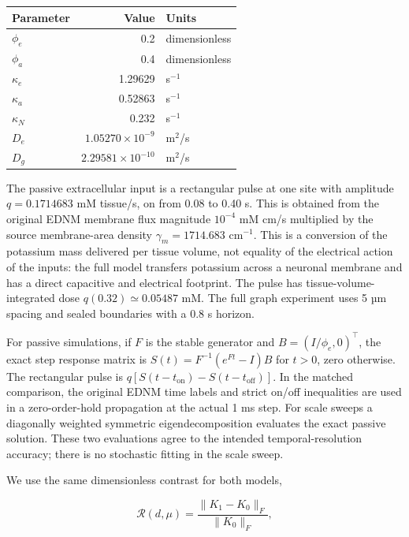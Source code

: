 \documentclass[
  11pt,
]{article}
\begin{document}
\begin{longtable}[]{@{}lrl@{}}
\toprule\noalign{}
Parameter & Value & Units \\
\midrule\noalign{}
\endhead
\bottomrule\noalign{}
\endlastfoot
\(\phi_e\) & 0.2 & dimensionless \\
\(\phi_a\) & 0.4 & dimensionless \\
\(\kappa_e\) & 1.29629 & s\(^{-1}\) \\
\(\kappa_a\) & 0.52863 & s\(^{-1}\) \\
\(\kappa_N\) & 0.232 & s\(^{-1}\) \\
\(D_e\) & \(1.05270\times10^{-9}\) & m\(^2\)/s \\
\(D_g\) & \(2.29581\times10^{-10}\) & m\(^2\)/s \\
\end{longtable}

The passive extracellular input is a rectangular pulse at one site with
amplitude \(q=0.1714683\) mM tissue/s, on from 0.08 to 0.40 s. This is
obtained from the original EDNM membrane flux magnitude \(10^{-4}\) mM
cm/s multiplied by the source membrane-area density
\(\gamma_m=1714.683\) cm\(^{-1}\). This is a conversion of the potassium
mass delivered per tissue volume, not equality of the electrical action
of the inputs: the full model transfers potassium across a neuronal
membrane and has a direct capacitive and electrical footprint. The pulse
has tissue-volume-integrated dose \(q(0.32)\simeq0.05487\) mM. The full
graph experiment uses 5 µm spacing and sealed boundaries with a 0.8 s
horizon.

For passive simulations, if \(F\) is the stable generator and
\(B=(I/\phi_e,0)^\top\), the exact step response matrix is
\(S(t)=F^{-1}(e^{Ft}-I)B\) for \(t>0\), zero otherwise. The rectangular
pulse is \(q[S(t-t_{\mathrm{on}})-S(t-t_{\mathrm{off}})]\). In the
matched comparison, the original EDNM time labels and strict on/off
inequalities are used in a zero-order-hold propagation at the actual 1
ms step. For scale sweeps a diagonally weighted symmetric
eigendecomposition evaluates the exact passive solution. These two
evaluations agree to the intended temporal-resolution accuracy; there is
no stochastic fitting in the scale sweep.

We use the same dimensionless contrast for both models,

\[\mathcal R(d,\mu)=\frac{\|K_1-K_0\|_F}{\|K_0\|_F},\]
\end{document}
